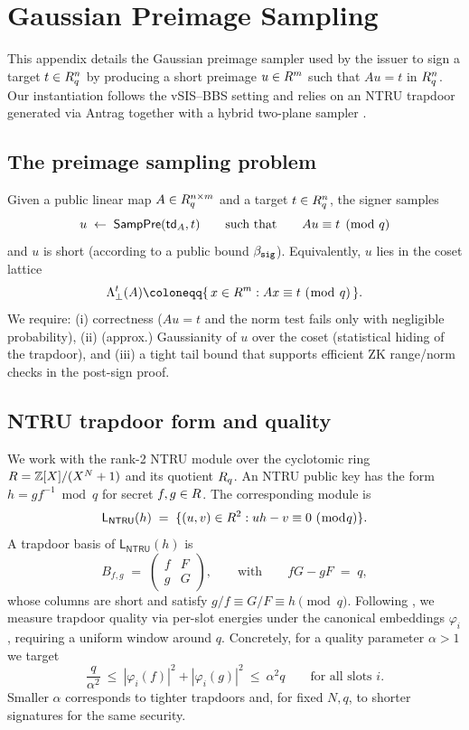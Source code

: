 \section{Gaussian Preimage Sampling}
\label{app:gaussian-sampler}

This appendix details the Gaussian preimage sampler used by the issuer to sign a target \(t\in R_q^n\) by producing a
short preimage \(u\in R^m\) such that \(A u = t\) in \(R_q^n\). Our instantiation follows the vSIS--BBS setting
\cite{EPRINT:DKLW25} and relies on an NTRU trapdoor generated via Antrag together with a hybrid two-plane sampler
\cite{EPRINT:ENSTW23}.

\subsection{The preimage sampling problem}
Given a public linear map \(A\in R_q^{n\times m}\) and a target \(t\in R_q^n\), the signer samples
\[
  u \;\gets\; \mathsf{SampPre}(\mathsf{td}_A,t)
  \qquad\text{such that}\qquad
  A u \equiv t \pmod q
\]
and \(u\) is short (according to a public bound \(\beta_{\mathtt{sig}}\)). Equivalently, \(u\) lies in the coset lattice
\[
  \Lambda_{\perp}^{t}(A)\coloneqq \{\,x\in\R^{m} : A x \equiv t\ (\bmod\ q)\,\}.
\]
We require:
(i) correctness (\(Au=t\) and the norm test fails only with negligible probability),
(ii) (approx.) Gaussianity of \(u\) over the coset (statistical hiding of the trapdoor),
and (iii) a tight tail bound that supports efficient ZK range/norm checks in the post-sign proof.

\subsection{NTRU trapdoor form and quality}
\label{subsec:ntru-trapdoor}
We work with the rank-2 NTRU module over the cyclotomic ring \(R=\mathbb{Z}[X]/(X^N+1)\) and its quotient \(R_q\). An NTRU
public key has the form \(h=g f^{-1}\bmod q\) for secret \(f,g\in R\). The corresponding module is
\[
  \mathsf{L}_{\mathsf{NTRU}}(h)
  \;=\;
  \{(u,v)\in R^2 : u h - v \equiv 0 \ (\bmod q)\}.
\]
A trapdoor basis of \(\mathsf{L}_{\mathsf{NTRU}}(h)\) is
\[
  B_{f,g}
  \;=\;
  \begin{pmatrix}
    f & F\\
    g & G
  \end{pmatrix},
  \qquad\text{with}\qquad fG - gF \;=\; q,
\]
whose columns are short and satisfy \(g/f \equiv G/F \equiv h \pmod q\). Following \cite{EPRINT:ENSTW23}, we
measure trapdoor quality via per-slot energies under the canonical embeddings \(\varphi_i\), requiring a uniform window
around \(q\). Concretely, for a quality parameter \(\alpha>1\) we target
\[
  \frac{q}{\alpha^2} \ \le\ |\varphi_i(f)|^2 + |\varphi_i(g)|^2 \ \le\ \alpha^2 q
  \qquad\text{for all slots \(i\)}.
\]
Smaller \(\alpha\) corresponds to tighter trapdoors and, for fixed \(N,q\), to shorter signatures for the same security.

